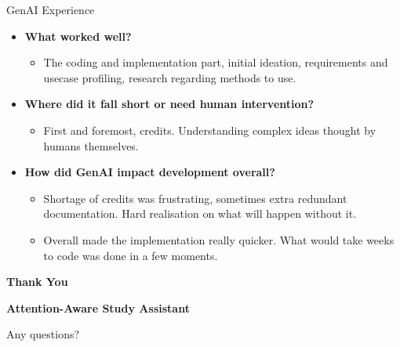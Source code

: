 \documentclass[aspectratio=169]{beamer}
\begin{document}
\begin{frame}{GenAI Experience}
    \begin{itemize}
        \item \textbf{What worked well?}
        \begin{itemize}
            \item The coding and implementation part, initial ideation, requirements and usecase profiling, research regarding methods to use.
        \end{itemize}
        \item \textbf{Where did it fall short or need human intervention?}
        \begin{itemize}
            \item First and foremost, credits. Understanding complex ideas thought by humans themselves.
        \end{itemize}
        \item \textbf{How did GenAI impact development overall?}
        \begin{itemize}
            \item Shortage of credits was frustrating, sometimes extra redundant documentation. Hard realisation on what will happen without it. 
            \item Overall made the implementation really quicker. What would take weeks to code was done in a few moments.
        \end{itemize}
    \end{itemize}
\end{frame}

\begin{frame}[plain]
    \begin{center}
        \vspace{2cm}
        \Huge \textbf{Thank You}
        
        \vspace{1cm}
        \Large \textbf{Attention-Aware Study Assistant}
        
        \vspace{0.5cm}
        \normalsize Any questions?
    \end{center}
\end{frame}
\end{document}

